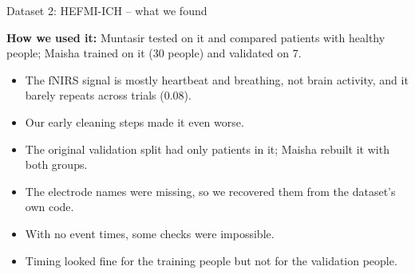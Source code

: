 \documentclass[aspectratio=169,11pt]{beamer}
\begin{document}
\begin{frame}{Dataset 2: HEFMI-ICH -- what we found}
\begin{slidebox}
\small
\textbf{How we used it:} Muntasir tested on it and compared patients with healthy people; Maisha trained on it (30 people) and validated on 7.
\begin{itemize}\setlength{\itemsep}{3pt}
  \item The fNIRS signal is mostly heartbeat and breathing, not brain activity, and it barely repeats across trials (0.08).
  \item Our early cleaning steps made it even worse.
  \item The original validation split had only patients in it; Maisha rebuilt it with both groups.
  \item The electrode names were missing, so we recovered them from the dataset's own code.
  \item With no event times, some checks were impossible.
  \item Timing looked fine for the training people but not for the validation people.
\end{itemize}
\end{slidebox}
\end{frame}
\end{document}
